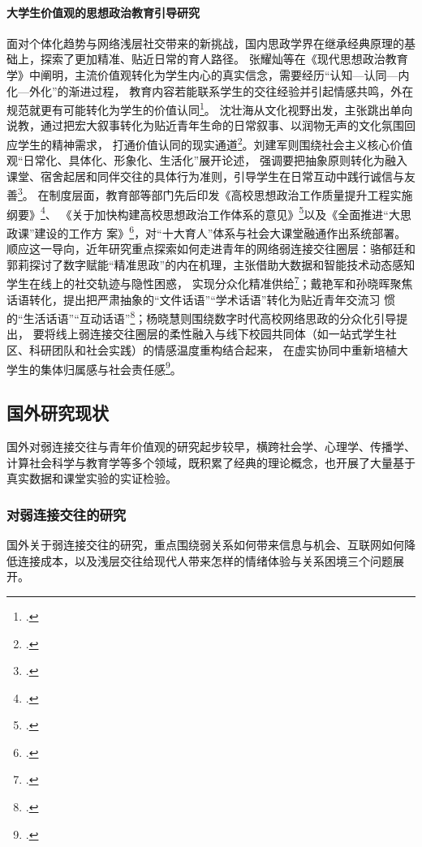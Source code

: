 \paragraph{大学生价值观的思想政治教育引导研究}
面对个体化趋势与网络浅层社交带来的新挑战，国内思政学界在继承经典原理的基础上，探索了更加精准、贴近日常的育人路径。
张耀灿等在《现代思想政治教育学》中阐明，主流价值观转化为学生内心的真实信念，需要经历“认知—认同—内化—外化”的渐进过程，
教育内容若能联系学生的交往经验并引起情感共鸣，外在规范就更有可能转化为学生的价值认同\footcite{Zhang2006}。
沈壮海从文化视野出发，主张跳出单向说教，通过把宏大叙事转化为贴近青年生命的日常叙事、以润物无声的文化氛围回应学生的精神需求，
打通价值认同的现实通道\footcite{Shen2013}。刘建军则围绕社会主义核心价值观“日常化、具体化、形象化、生活化”展开论述，
强调要把抽象原则转化为融入课堂、宿舍起居和同伴交往的具体行为准则，引导学生在日常互动中践行诚信与友善\footcite{Liu2016}。
在制度层面，教育部等部门先后印发《高校思想政治工作质量提升工程实施纲要》\footcite{MOE2017_Gangyao}、
《关于加快构建高校思想政治工作体系的意见》\footcite{MOE2020_Gangshen}以及《全面推进“大思政课”建设的工作方
案》\footcite{MOE2022_Fangan}，对“十大育人”体系与社会大课堂融通作出系统部署。
顺应这一导向，近年研究重点探索如何走进青年的网络弱连接交往圈层：骆郁廷和郭莉探讨了数字赋能“精准思政”的内在机理，主张借助大数据和智能技术动态感知学生在线上的社交轨迹与隐性困惑，
实现分众化精准供给\footcite{Luo2022}；戴艳军和孙晓晖聚焦话语转化，提出把严肃抽象的“文件话语”“学术话语”转化为贴近青年交流习
惯的“生活话语”“互动话语”\footcite{Dai2021}；杨晓慧则围绕数字时代高校网络思政的分众化引导提出，
要将线上弱连接交往圈层的柔性融入与线下校园共同体（如一站式学生社区、科研团队和社会实践）的情感温度重构结合起来，
在虚实协同中重新培植大学生的集体归属感与社会责任感\footcite{Yang2023}。

\subsection{国外研究现状}
\label{sec:international-research}

国外对弱连接交往与青年价值观的研究起步较早，横跨社会学、心理学、传播学、计算社会科学与教育学等多个领域，既积累了经典的理论概念，也开展了大量基于真实数据和课堂实验的实证检验。

\subsubsection{对弱连接交往的研究}

国外关于弱连接交往的研究，重点围绕弱关系如何带来信息与机会、互联网如何降低连接成本，以及浅层交往给现代人带来怎样的情绪体验与关系困境三个问题展开。

